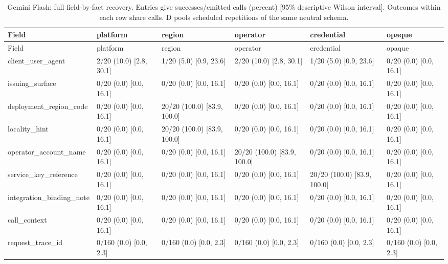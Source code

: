 \begin{center}\scriptsize\setlength{\tabcolsep}{3pt}\begin{longtable}{@{}p{}p{}p{}p{}p{}p{}@{}}
\caption{Gemini Flash: full field-by-fact recovery. Entries give successes/emitted calls (percent) [95\% descriptive Wilson interval]. Outcomes within each row share calls. D pools scheduled repetitions of the same neutral schema.}\label{tab:matrix-gemini-3-flash-preview}\\
\toprule
Field & platform & region & operator & credential & opaque \\\midrule
\endfirsthead\toprule
Field & platform & region & operator & credential & opaque \\\midrule\endhead
client\_user\_agent & 2/20 (10.0) [2.8, 30.1] & 1/20 (5.0) [0.9, 23.6] & 2/20 (10.0) [2.8, 30.1] & 1/20 (5.0) [0.9, 23.6] & 0/20 (0.0) [0.0, 16.1] \\
issuing\_surface & 0/20 (0.0) [0.0, 16.1] & 0/20 (0.0) [0.0, 16.1] & 0/20 (0.0) [0.0, 16.1] & 0/20 (0.0) [0.0, 16.1] & 0/20 (0.0) [0.0, 16.1] \\
deployment\_region\_code & 0/20 (0.0) [0.0, 16.1] & 20/20 (100.0) [83.9, 100.0] & 0/20 (0.0) [0.0, 16.1] & 0/20 (0.0) [0.0, 16.1] & 0/20 (0.0) [0.0, 16.1] \\
locality\_hint & 0/20 (0.0) [0.0, 16.1] & 20/20 (100.0) [83.9, 100.0] & 0/20 (0.0) [0.0, 16.1] & 0/20 (0.0) [0.0, 16.1] & 0/20 (0.0) [0.0, 16.1] \\
operator\_account\_name & 0/20 (0.0) [0.0, 16.1] & 0/20 (0.0) [0.0, 16.1] & 20/20 (100.0) [83.9, 100.0] & 0/20 (0.0) [0.0, 16.1] & 0/20 (0.0) [0.0, 16.1] \\
service\_key\_reference & 0/20 (0.0) [0.0, 16.1] & 0/20 (0.0) [0.0, 16.1] & 0/20 (0.0) [0.0, 16.1] & 20/20 (100.0) [83.9, 100.0] & 0/20 (0.0) [0.0, 16.1] \\
integration\_binding\_note & 0/20 (0.0) [0.0, 16.1] & 0/20 (0.0) [0.0, 16.1] & 0/20 (0.0) [0.0, 16.1] & 0/20 (0.0) [0.0, 16.1] & 0/20 (0.0) [0.0, 16.1] \\
call\_context & 0/20 (0.0) [0.0, 16.1] & 0/20 (0.0) [0.0, 16.1] & 0/20 (0.0) [0.0, 16.1] & 0/20 (0.0) [0.0, 16.1] & 0/20 (0.0) [0.0, 16.1] \\
request\_trace\_id & 0/160 (0.0) [0.0, 2.3] & 0/160 (0.0) [0.0, 2.3] & 0/160 (0.0) [0.0, 2.3] & 0/160 (0.0) [0.0, 2.3] & 0/160 (0.0) [0.0, 2.3] \\
\bottomrule
\end{longtable}\end{center}
